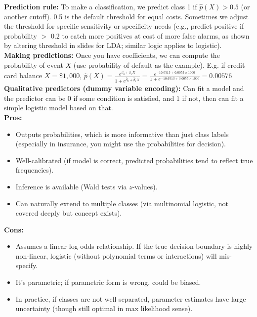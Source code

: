 \documentclass[11pt]{article}
\begin{document}
\noindent \textbf{Prediction rule:} To make a classification, we predict class 1 if $\hat p(X) > 0.5$ (or another cutoff). 0.5 is the default threshold for equal costs. Sometimes we adjust the threshold for specific sensitivity or specificity needs (e.g., predict positive if probability $>$ 0.2 to catch more positives at cost of more false alarms, as shown by altering threshold in slides for LDA; similar logic applies to logistic). \\

\noindent \textbf{Making predictions:} Once you have coefficients, we can compute the probability of event $X$ (use probability of default as the example). E.g. if credit card balance $X = \$1,000$, $\hat{p}(X) = \frac{e^{\hat{\beta}_{0} + \hat{\beta}_{1}X}}{1 + e^{\hat{\beta}_{0} + \hat{\beta}_{1}X}} = \frac{e^{-10.6513 + 0.0055 \times 1000}}{1 + e^{-10.6513 + 0.0055 \times 1000}} = 0.00576$ \\

\noindent \textbf{Qualitative predictors (dummy variable encoding):} Can fit a model and the predictor can be $0$ if some condition is satisfied, and $1$ if not, then can fit a simple logistic model based on that. \\

\noindent \textbf{Pros:}
\begin{itemize}
    \item  Outputs probabilities, which is more informative than just class labels (especially in insurance, you might use the probabilities for decision).
    \item Well-calibrated (if model is correct, predicted probabilities tend to reflect true frequencies).
    \item Inference is available (Wald tests via $z$-values).
    \item Can naturally extend to multiple classes (via multinomial logistic, not covered deeply but concept exists).
\end{itemize}


\noindent \textbf{Cons:}
\begin{itemize}
    \item Assumes a linear log-odds relationship. If the true decision boundary is highly non-linear, logistic (without polynomial terms or interactions) will mis-specify.
    \item It’s parametric; if parametric form is wrong, could be biased.
    \item In practice, if classes are not well separated, parameter estimates have large uncertainty (though still optimal in max likelihood sense).
\end{itemize}
\end{document}
